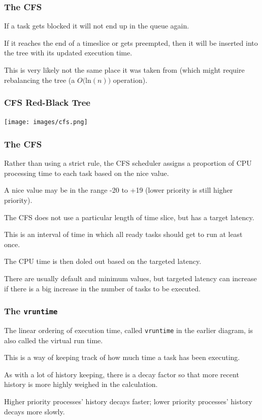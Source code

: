\begin{frame}
\frametitle{The CFS}

If a task gets blocked it will not end up in the queue again. 

If it reaches the end of a timeslice or gets preempted, then it will be inserted into the tree with its updated execution time.

This is very likely not the same place it was taken from (which might require rebalancing the tree (a $O($ln$(n))$ operation).


\end{frame}

\begin{frame}
\frametitle{CFS Red-Black Tree}

\begin{center}
	\texttt{[image: images/cfs.png]}
\end{center}


\end{frame}

\begin{frame}
\frametitle{The CFS}

Rather than using a strict rule, the CFS scheduler assigns a proportion of CPU processing time to each task based on the nice value. 

A nice value may be in the range -20 to +19 (lower priority is still higher priority).

The CFS does not use a particular length of time slice, but has a \alert{target latency}.

This is an interval of time in which all ready tasks should get to run at least once. 

The CPU time is then doled out based on the targeted latency. 

There are usually default and minimum values, but targeted latency can increase if there is a big increase in the number of tasks to be executed.

\end{frame}

\begin{frame}
\frametitle{The \texttt{vruntime}}

The linear ordering of execution time, called \texttt{vruntime} in the earlier diagram, is also called the \alert{virtual run time}.

 This is a way of keeping track of how much time a task has been executing. 
 
 As with a lot of history keeping, there is a decay factor so that more recent history is more highly weighed in the calculation. 
 
 Higher priority processes' history decays faster; lower priority processes' history decays more slowly. 
 

\end{frame}

